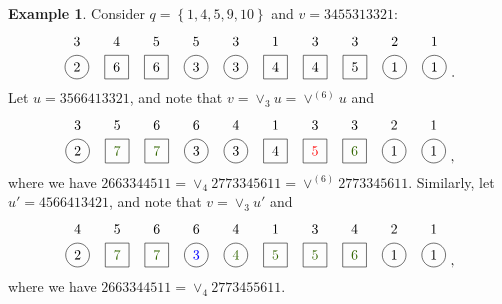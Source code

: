 \documentclass[reqno]{amsart}
\newcommand{\0}{\phantom{c}}
\newcommand{\merge}[1]{\vee_{#1}} %
\newcommand{\set}[1]{\left\{ #1 \right\}}
\theoremstyle{plain}
\theoremstyle{definition}
\newtheorem{example}[thm]{Example}
\numberwithin{equation}{section}
\begin{document}
\begin{example}
Consider $q = \set{1,4,5,9,10}$ and $v = 3455313321$:
\[
\begin{tikzpicture}[baseline=-7]
  \def\ll{0.65}   %
  \foreach \i in {6,10} { \node at (\i,\ll) {$1$}; }
  \foreach \i in {9} { \node at (\i,\ll) {$2$}; }
  \foreach \i in {1,5,7,8} { \node at (\i,\ll) {$3$}; }
  \foreach \i in {2} { \node at (\i,\ll) {$4$}; }
  \foreach \i in {3,4} { \node at (\i,\ll) {$5$}; }
  \foreach \i in {1,4,5,9,10} { \draw (\i,0) circle (0.3); }
  \foreach \i in {2,3,6,7,8} { \draw (\i-.3,0-.3) rectangle +(0.6,+0.6); }
  \foreach \i in {9,10} { \node at (\i,0) {$1$}; }
  \foreach \i in {1} { \node at (\i,0) {$2$}; }
  \foreach \i in {4,5} { \node at (\i,0) {$3$}; }
  \foreach \i in {6,7} { \node at (\i,0) {$4$}; }
  \foreach \i in {8} { \node at (\i,0) {$5$}; }
  \foreach \i in {2,3} { \node at (\i,0) {$6$}; }
\end{tikzpicture}\ .
\]
Let $u = 3566413321$, and note that $v = \merge{3} u = \vee^{(6)} u$ and
\[
\begin{tikzpicture}[baseline=-7]
  \def\ll{0.65}   %
  \foreach \i in {6,10} { \node at (\i,\ll) {$1$}; }
  \foreach \i in {9} { \node at (\i,\ll) {$2$}; }
  \foreach \i in {1,7,8} { \node at (\i,\ll) {$3$}; }
  \foreach \i in {5} { \node at (\i,\ll) {$4$}; }
  \foreach \i in {2} { \node at (\i,\ll) {$5$}; }
  \foreach \i in {3,4} { \node at (\i,\ll) {$6$}; }
  \foreach \i in {1,4,5,9,10} { \draw (\i,0) circle (0.3); }
  \foreach \i in {2,3,6,7,8} { \draw (\i-.3,0-.3) rectangle +(0.6,+0.6); }
  \foreach \i in {9,10} { \node at (\i,0) {$1$}; }
  \foreach \i in {1} { \node at (\i,0) {$2$}; }
  \foreach \i in {4,5} { \node at (\i,0) {$3$}; }
  \foreach \i in {6} { \node at (\i,0) {$4$}; }
  \foreach \i in {7} { \node[red] at (\i,0) {$5$}; }
  \foreach \i in {8} { \node[dgreencolor] at (\i,0) {$6$}; }
  \foreach \i in {2,3} { \node[dgreencolor] at (\i,0) {$7$}; }
\end{tikzpicture}\ ,
\]
where we have $2663344511 = \merge{4} 2773345611 = \vee^{(6)} 2773345611$.
Similarly, let $u' = 4566413421$, and note that $v = \merge{3} u'$ and
\[
\begin{tikzpicture}[baseline=-7]
  \def\ll{0.65}   %
  \foreach \i in {6,10} { \node at (\i,\ll) {$1$}; }
  \foreach \i in {9} { \node at (\i,\ll) {$2$}; }
  \foreach \i in {7} { \node at (\i,\ll) {$3$}; }
  \foreach \i in {1,5,8} { \node at (\i,\ll) {$4$}; }
  \foreach \i in {2} { \node at (\i,\ll) {$5$}; }
  \foreach \i in {3,4} { \node at (\i,\ll) {$6$}; }
  \foreach \i in {1,4,5,9,10} { \draw (\i,0) circle (0.3); }
  \foreach \i in {2,3,6,7,8} { \draw (\i-.3,0-.3) rectangle +(0.6,+0.6); }
  \foreach \i in {9,10} { \node at (\i,0) {$1$}; }
  \foreach \i in {1} { \node at (\i,0) {$2$}; }
  \foreach \i in {4} { \node[blue] at (\i,0) {$3$}; }
  \foreach \i in {5} { \node[dgreencolor] at (\i,0) {$4$}; }
  \foreach \i in {6,7} { \node[dgreencolor] at (\i,0) {$5$}; }
  \foreach \i in {8} { \node[dgreencolor] at (\i,0) {$6$}; }
  \foreach \i in {2,3} { \node[dgreencolor] at (\i,0) {$7$}; }
\end{tikzpicture}\ ,
\]
where we have $2663344511 = \merge{4} 2773455611$.
\end{example}
\end{document}
